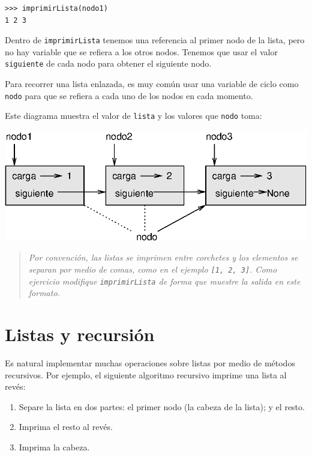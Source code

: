 \beforeverb
\begin{verbatim}
>>> imprimirLista(nodo1)
1 2 3
\end{verbatim}
\afterverb
%
Dentro de \texttt{imprimirLista} tenemos una referencia al primer nodo 
de la lista, pero no hay variable que se refiera a los otros nodos. Tenemos
que usar el valor \texttt{siguiente} de cada nodo para obtener el siguiente
nodo.

Para recorrer una lista enlazada, es muy común usar una variable de ciclo
como \texttt{nodo} para que se refiera a cada uno de los nodos en cada 
momento.


Este diagrama muestra el valor de \texttt{lista} y los valores que \texttt{nodo}
 toma:

\beforefig
\centerline{\includegraphics{illustrations/link3.eps}}
\afterfig

\begin{quote}
{\em Por convención, las listas se imprimen entre corchetes y los elementos
se separan por medio de comas, como en el ejemplo \texttt{[1, 2, 3]}.  Como 
ejercicio modifique \texttt{imprimirLista} de forma que muestre la salida
en este formato.}
\end{quote}


\section{Listas y recursión}
\label{listrecursion}

Es natural implementar muchas operaciones sobre listas por medio de 
métodos recursivos. Por ejemplo, el siguiente algoritmo recursivo
imprime una lista al revés:

\begin{enumerate}

\item Separe la lista en dos partes: el primer nodo (la cabeza de la
lista); y el resto.

\item Imprima el resto al revés.

\item Imprima la cabeza.

\end{enumerate}

